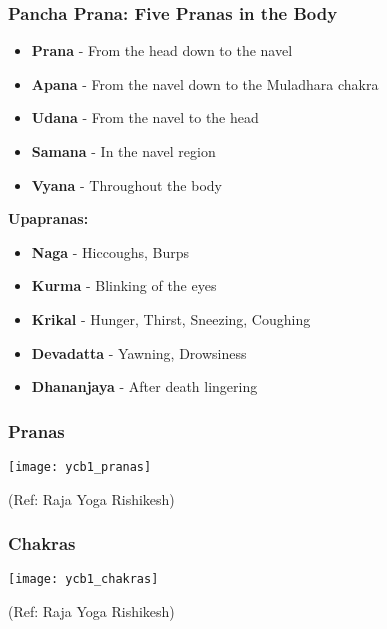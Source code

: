 \begin{frame}[fragile]\frametitle{Pancha Prana: Five Pranas in the Body}
    \begin{itemize}
        \item \textbf{Prana} - From the head down to the navel
        \item \textbf{Apana} - From the navel down to the Muladhara chakra
        \item \textbf{Udana} - From the navel to the head
        \item \textbf{Samana} - In the navel region
        \item \textbf{Vyana} - Throughout the body
    \end{itemize}
    \vspace{0.5cm}
    \textbf{Upapranas:}
    \begin{itemize}
        \item \textbf{Naga} - Hiccoughs, Burps
        \item \textbf{Kurma} - Blinking of the eyes
        \item \textbf{Krikal} - Hunger, Thirst, Sneezing, Coughing
        \item \textbf{Devadatta} - Yawning, Drowsiness
        \item \textbf{Dhananjaya} - After death lingering
    \end{itemize}
\end{frame}

\begin{frame}[fragile]\frametitle{Pranas}
        \begin{center}
        \texttt{[image: ycb1\_pranas]}
				
		{\tiny (Ref: Raja Yoga Rishikesh)}	 
        \end{center}	

\end{frame}
\begin{frame}[fragile]\frametitle{Chakras}
        \begin{center}
        \texttt{[image: ycb1\_chakras]}
				
		{\tiny (Ref: Raja Yoga Rishikesh)}	 
        \end{center}	

\end{frame}

